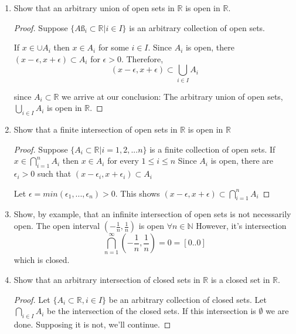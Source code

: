 \documentclass{tufte-book}
\theoremstyle{mytheoremstyle}
\theoremstyle{mylemstyle}
\theoremstyle{mydefstyle}
\begin{document}
\begin{enumerate}
\begin{proof}
\end{proof}

\item Show that an arbitrary union of open sets in $\mathbb{R}$ is open in $\mathbb{R}$.

\begin{proof}
Suppose $\{Aß_i \subset \mathbb{R} | i \in I\}$ is an arbitrary collection of open sets.

If $x \in \cup A_i$ then $x \in A_i$ for some $i \in I$.  Since $A_i$ is open,  there $(x - \epsilon, x+ \epsilon) \subset A_i$ for $\epsilon > 0$.  Therefore,
\[ (x-\epsilon, x+\epsilon) \subset \bigcup\limits_{i \in I}A_i \]

 since $A_i \subset \mathbb{R}$ we arrive at our conclusion: The arbitrary union of open sets, $\bigcup\limits_{i \in I}A_i$ is open in $\mathbb{R}$. 
\end{proof}

\item Show that a finite intersection of open sets in $\mathbb{R}$ is open in $\mathbb{R}$
\begin{proof}
Suppose $\{A_i \subset \mathbb{R} | i = 1,2,...n\}$ is a finite collection of open sets.  If $ x \in \bigcap\limits_{i=1}^{n} A_i $ then $x \in A_i$ for every $1 \leq i \leq n$ Since $A_i$ is open, there are $\epsilon_i > 0$  such that $(x - \epsilon_i , x+ \epsilon_i) \subset A_i$

Let $\epsilon = min(\epsilon_1,..., \epsilon_n) > 0$.  This shows $(x - \epsilon, x+ \epsilon) \subset  \bigcap\limits_{i=1}^{n} A_i $

\end{proof}

\item Show, by example, that an infinite intersection of open sets is not necessarily open.
The open interval $(- \frac{1}{n},\frac{1}{n})$ is open $\forall n \in \mathbb{N}$  However, it's intersection
\[ \bigcap\limits_{n=1}^{\infty}(- \frac{1}{n},\frac{1}{n}) = {0} = [0..0] \]
which is closed. 

\item Show that an arbitrary intersection of closed sets in $\mathbb{R}$ is a closed set in $\mathbb{R}$.
\begin{proof}

Let $\{A_i \subset \mathbb{R}, i \in I\}$ be an arbitrary collection of closed sets.   Let $\bigcap\limits_{i \in I} A_i$ be the intersection of the closed sets.  If this intersection is $\emptyset$ we are done.  Supposing it is not, we'll continue.


\end{proof}
\end{enumerate}
\end{document}
